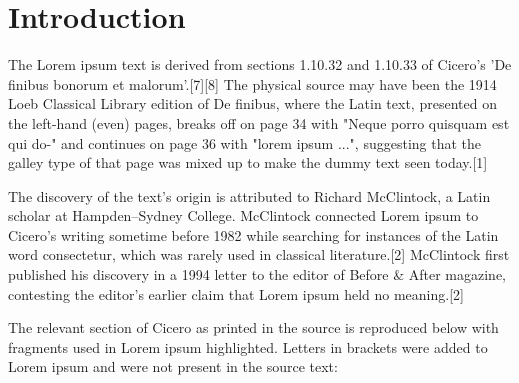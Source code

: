 
\section{Introduction}

The Lorem ipsum text is derived from sections 1.10.32 and 1.10.33 of Cicero's
'De finibus bonorum et malorum'.[7][8] The physical source may have been the
1914 Loeb Classical Library edition of De finibus, where the Latin text,
presented on the left-hand (even) pages, breaks off on page 34 with "Neque
porro quisquam est qui do-" and continues on page 36 with "lorem ipsum ...",
suggesting that the galley type of that page was mixed up to make the dummy
text seen today.[1]

The discovery of the text's origin is attributed to Richard McClintock, a Latin
scholar at Hampden–Sydney College. McClintock connected Lorem ipsum to Cicero's
writing sometime before 1982 while searching for instances of the Latin word
consectetur, which was rarely used in classical literature.[2] McClintock first
published his discovery in a 1994 letter to the editor of Before \& After
magazine, contesting the editor's earlier claim that Lorem ipsum held no
meaning.[2]

The relevant section of Cicero as printed in the source is reproduced below
with fragments used in Lorem ipsum highlighted. Letters in brackets were added
to Lorem ipsum and were not present in the source text:

